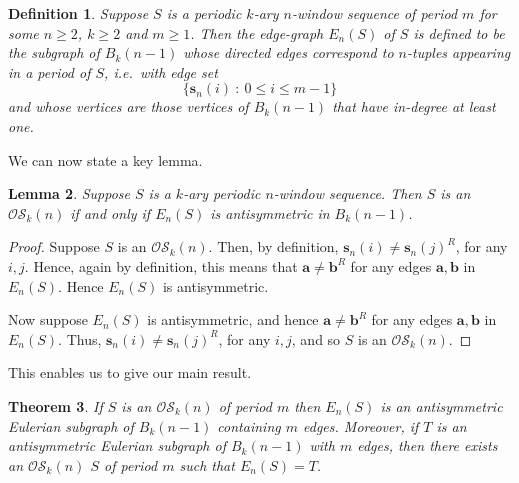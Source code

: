\documentclass[a4paper,11pt]{article}
\newtheorem{lemma}{Lemma}[section]
\newtheorem{theorem}[lemma]{Theorem}
\newtheorem{definition}[lemma]{Definition}
\begin{document}
\begin{definition}  \label{definition:En(s)}
Suppose $S$ is a periodic $k$-ary $n$-window sequence of period $m$ for some $n\geq2$, $k\geq2$
and
$m\geq1$. Then the \emph{edge-graph} $E_n(S)$ of $S$ is defined to be the subgraph of $B_{k}(n-1)$
whose directed edges correspond to $n$-tuples appearing in a period of $S$, i.e.\ with edge set
\[ \{ \mathbf{s}_n(i)~:~0\leq i\leq m-1  \} \]
and whose vertices are those vertices of $B_{k}(n-1)$ that have in-degree at least one.
\end{definition}

We can now state a key lemma.

\begin{lemma}  \label{lemma:OS_iff_antisymmetric}
Suppose $S$ is a $k$-ary periodic $n$-window sequence.  Then $S$ is an $\mathcal{OS}_k(n)$ if and
only if $E_n(S)$ is antisymmetric in $B_{k}(n-1)$.
\end{lemma}

\begin{proof}
Suppose $S$ is an $\mathcal{OS}_k(n)$.  Then, by definition, $\mathbf{s}_n(i) \neq
\mathbf{s}_n(j)^R$, for any $i,j$.  Hence, again by definition, this means that $\mathbf{a}\neq
\mathbf{b}^R$ for any edges $\mathbf{a},\mathbf{b}$ in $E_n(S)$.  Hence $E_n(S)$ is antisymmetric.

Now suppose $E_n(S)$ is antisymmetric, and hence $\mathbf{a}\neq \mathbf{b}^R$ for any edges
$\mathbf{a},\mathbf{b}$ in $E_n(S)$.  Thus, $\mathbf{s}_n(i) \neq \mathbf{s}_n(j)^R$, for any
$i,j$, and so $S$ is an $\mathcal{OS}_k(n)$.
\end{proof}

This enables us to give our main result.

\begin{theorem}  \label{theorem:correspondence}
If $S$ is an $\mathcal{OS}_k(n)$ of period $m$ then $E_n(S)$ is an antisymmetric Eulerian subgraph
of $B_{k}(n-1)$ containing $m$ edges.  Moreover, if $T$ is an antisymmetric Eulerian subgraph of
$B_{k}(n-1)$ with $m$ edges, then there exists an $\mathcal{OS}_k(n)$ $S$ of period $m$ such that
$E_n(S)=T$.
\end{theorem}
\end{document}
